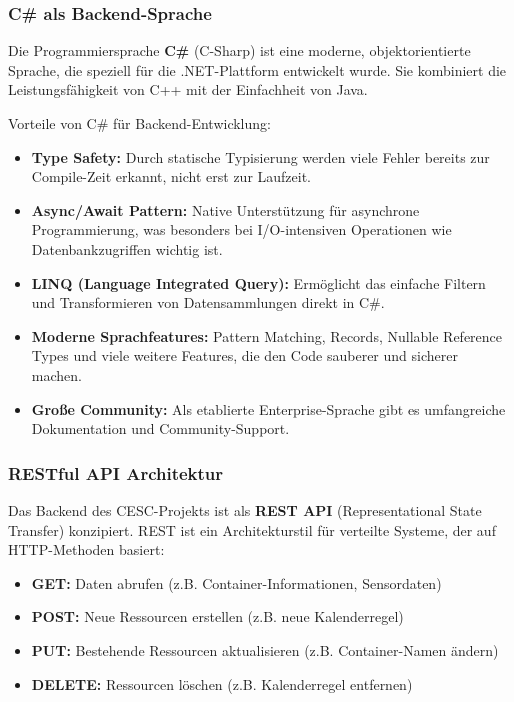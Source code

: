 \subsubsection{C\# als Backend-Sprache}

Die Programmiersprache \textbf{C\#} (C-Sharp) ist eine moderne, objektorientierte Sprache, die speziell für die .NET-Plattform entwickelt wurde. Sie kombiniert die Leistungsfähigkeit von C++ mit der Einfachheit von Java.

Vorteile von C\# für Backend-Entwicklung:

\begin{itemize}
    \item \textbf{Type Safety:} Durch statische Typisierung werden viele Fehler bereits zur Compile-Zeit erkannt, nicht erst zur Laufzeit.
    \item \textbf{Async/Await Pattern:} Native Unterstützung für asynchrone Programmierung, was besonders bei I/O-intensiven Operationen wie Datenbankzugriffen wichtig ist.
    \item \textbf{LINQ (Language Integrated Query):} Ermöglicht das einfache Filtern und Transformieren von Datensammlungen direkt in C\#.
    \item \textbf{Moderne Sprachfeatures:} Pattern Matching, Records, Nullable Reference Types und viele weitere Features, die den Code sauberer und sicherer machen.
    \item \textbf{Große Community:} Als etablierte Enterprise-Sprache gibt es umfangreiche Dokumentation und Community-Support.
\end{itemize}

\subsubsection{RESTful API Architektur}

Das Backend des CESC-Projekts ist als \textbf{REST API} (Representational State Transfer) konzipiert. REST ist ein Architekturstil für verteilte Systeme, der auf HTTP-Methoden basiert:

\begin{itemize}
    \item \textbf{GET:} Daten abrufen (z.B. Container-Informationen, Sensordaten)
    \item \textbf{POST:} Neue Ressourcen erstellen (z.B. neue Kalenderregel)
    \item \textbf{PUT:} Bestehende Ressourcen aktualisieren (z.B. Container-Namen ändern)
    \item \textbf{DELETE:} Ressourcen löschen (z.B. Kalenderregel entfernen)
\end{itemize}

